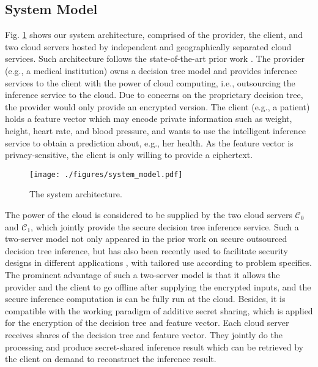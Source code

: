 \documentclass[10pt,journal,compsoc]{IEEEtran}
\begin{document}
\subsection{System Model}

Fig. \ref{fig:system_architecture} shows our system architecture, comprised of the provider, the client, and two cloud servers hosted by independent and geographically separated cloud services.
%
Such architecture follows the state-of-the-art prior work \cite{ZhengDWWN20}.
%
The provider (e.g., a medical institution) owns a decision tree model and provides inference services to the client with the power of cloud computing, i.e., outsourcing the inference service to the cloud.
%
Due to concerns on the proprietary decision tree, the provider would only provide an encrypted version.
%
The client (e.g., a patient) holds a feature vector which may encode private information such as weight, height, heart rate, and blood pressure, and wants to use the intelligent inference service to obtain a prediction about, e.g., her health.
%
As the feature vector is privacy-sensitive, the client is only willing to provide a ciphertext.



\begin{figure}[t!]
\centerline{\texttt{[image: ./figures/system\_model.pdf]}}
\caption{The system architecture.}
\label{fig:system_architecture}
\end{figure}


The power of the cloud is considered to be supplied by the two cloud servers $\mathcal{C}_0$ and $\mathcal{C}_1$, which jointly provide the secure decision tree inference service. 
%
Such a two-server model not only appeared in the prior work \cite{ZhengDWWN20} on secure outsourced decision tree inference, but has also been recently used to facilitate security designs in different applications \cite{WangWHZR16,MohasselZ17,0002SKG19,ChenPopa20,ZhengDW18}, with tailored use according to problem specifics.
%
The prominent advantage of such a two-server model is that it allows the provider and the client to go offline after supplying the encrypted inputs, and the secure inference computation is can be fully run at the cloud.
%
Besides, it is compatible with the working paradigm of additive secret sharing, which is applied for the encryption of the decision tree and feature vector. 
%
Each cloud server receives shares of the decision tree and feature vector.
%
They jointly do the processing and produce secret-shared inference result which can be retrieved by the client on demand to reconstruct the inference result.
\end{document}
